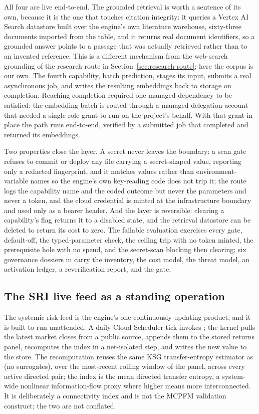 All four are live end-to-end. The grounded retrieval is worth a sentence of its
own, because it is the one that touches citation integrity: it queries a Vertex AI Search
datastore built over the engine's own literature warehouse, sixty-three documents imported
from the  table, and it returns real document identifiers, so a
grounded answer points to a passage that was actually retrieved rather than to an invented
reference. This is a different mechanism from the web-search grounding of the research
route in Section~\ref{sec:research-route}; here the corpus is our own. The fourth
capability, batch prediction, stages its input, submits a real asynchronous job, and writes
the resulting embeddings back to storage on completion. Reaching completion required one
managed dependency to be satisfied: the embedding batch is routed through a managed
delegation account that needed a single role grant to run on the project's behalf. With
that grant in place the path runs end-to-end, verified by a submitted job that completed
and returned its embeddings.

Two properties close the layer. A secret never leaves the boundary: a scan gate refuses to
commit or deploy any file carrying a secret-shaped value, reporting only a redacted
fingerprint, and it matches values rather than environment-variable names so the engine's
own key-reading code does not trip it; the route logs the capability name and the coded
outcome but never the parameters and never a token, and the cloud credential is minted at
the infrastructure boundary and used only as a bearer header. And the layer is reversible:
clearing a capability's flag returns it to a disabled state, and the retrieval datastore
can be deleted to return its cost to zero. The failable evaluation
 exercises every gate, default-off, the typed-parameter check,
the ceiling trip with no token minted, the prerequisite hole with no spend, and the
secret-scan blocking then clearing; six governance dossiers in  carry the
inventory, the cost model, the threat model, an activation ledger, a reverification report,
and the gate.

\subsection{The SRI live feed as a standing operation}
\label{sec:sri-feed}

The systemic-risk feed is the engine's one continuously-updating product, and it is
built to run unattended. A daily Cloud Scheduler tick invokes
; the kernel pulls the latest market closes from a
public source, appends them to the stored returns panel, recomputes the index in a
net-isolated step, and writes the new value to the 
store. The recomputation reuses the same KSG transfer-entropy estimator as
 (no surrogates), over the most-recent rolling window of the panel,
across every active directed pair; the index is the mean directed transfer entropy,
a system-wide nonlinear information-flow proxy where higher means more
interconnected. It is deliberately a connectivity index and is not the MCPFM
validation construct; the two are not conflated.

